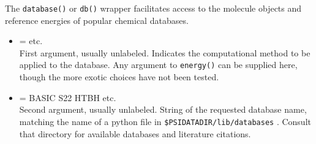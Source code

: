 The \texttt{database()} or \texttt{db()} wrapper facilitates access to
the molecule objects and reference energies of popular chemical databases.

\begin{itemize}
\item {} =  \textbar\;  \textbar\;  \textbar\; etc. \\
First argument, usually unlabeled. Indicates the computational method to be applied to the database.
Any argument to \texttt{energy()} can be supplied here, though the more exotic choices have not been tested.

\item {} = \textsf{\qq BASIC\qq} \textbar\; \textsf{\qq S22\qq} \textbar\; \textsf{\qq HTBH\qq} \textbar\; etc. \\

Second argument, usually unlabeled. String of the requested database name, matching the name of a
python file in \texttt{\$PSIDATADIR/lib/databases} . Consult that directory for available databases
and literature citations.
\end{itemize}


